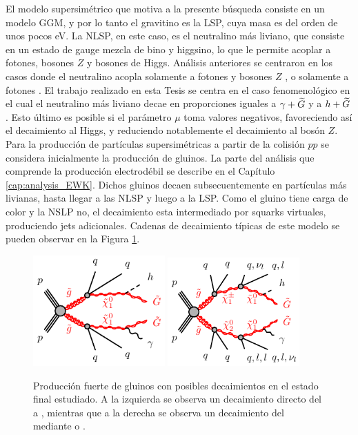El modelo supersimétrico que motiva a la presente búsqueda consiste en un modelo GGM, y por lo tanto el gravitino es la LSP, cuya masa es del orden de unos pocos eV. La NLSP, en este caso, es el neutralino más liviano, que consiste en un estado de gauge mezcla de bino y higgsino, lo que le permite acoplar a fotones, bosones $Z$ y bosones de Higgs.
Análisis anteriores se centraron en los casos donde el neutralino acopla solamente a fotones y bosones $Z$ \cite{Alonso:2147473, tesis_joaco, Collaboration:2198651, tesis_tony}, o solamente a fotones \cite{Jinnouchi:2233741}. El trabajo realizado en esta Tesis se centra en el caso fenomenológico en el cual el neutralino más liviano decae en proporciones iguales a $\gamma+\widetilde{G}$ y a $h+\widetilde{G}$. Esto último es posible si el parámetro $\mu$ toma valores negativos, favoreciendo así el decaimiento al Higgs, y reduciendo notablemente 
el decaimiento al bosón $Z$.
Para la producción de partículas supersimétricas a partir de la colisión $pp$ se considera inicialmente la producción de gluinos. La parte del análisis que comprende la producción electrodébil se describe en el Capítulo \ref{cap:analysis_EWK}. Dichos gluinos decaen subsecuentemente en partículas más livianas, hasta llegar a las NLSP y luego a la LSP.
Como el gluino tiene carga de color y la NSLP no, el decaimiento esta intermediado por squarks virtuales, produciendo jets adicionales.
Cadenas de decaimiento típicas de este modelo se pueden observar en la Figura \ref{fig:phb_feyn}.

\begin{figure}
  \centering
  \includegraphics[width=0.45\textwidth]{images/analysis/gogo-qqqqbbphGG-h_short.pdf}
  \includegraphics[width=0.45\textwidth]{images/analysis/gogo-qqqqbbphGG-h_long.pdf}
  \caption{Producción fuerte de gluinos con posibles decaimientos en el estado final estudiado. A la izquierda se observa un decaimiento directo del \gluino a \ninoone, mientras que a la derecha se observa un decaimiento del \gluino mediante \ninotwo o \chinoonepm.}
  \label{fig:phb_feyn}
\end{figure}

